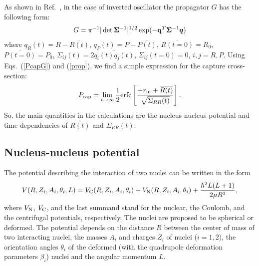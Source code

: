 \documentclass[preprint,review,12pt]{elsarticle}
\begin{document}
  As shown in Ref.~\cite{DMDadonov}, in the case of inverted oscillator the propagator $G$ has the following form:
  \begin{eqnarray}
  G=\pi^{-1}|\det {\bf \Sigma}^{-1}|^{1/2} \exp(-{\bf q}^{T}{\bf \Sigma}^{-1}{\bm q})
  \label{prop}
  \end{eqnarray}
  where
  $q_R(t)=R-\overline{R(t)}$, $q_P(t)=P-\overline{P(t)}$, $\overline{R(t=0)}=R_0$,
  $\overline{P(t=0)}=P_0$, $\Sigma_{ij}(t)=2\overline{q_i(t)q_j(t)}$, $\Sigma_{ij}(t=0)=0$,
  $i,j=R,P$.
  Using Eqs.~(\ref{PcapG}) and (\ref{prop}), we find a simple expression for the capture cross-section:
  \begin{eqnarray}
  P_{\rm cap}=\lim_{t\to\infty}\frac{1}{2} {\rm erfc}\left[\frac{-r_{\rm in}+\overline{R(t)}} {{\sqrt{\Sigma_{RR}(t)}}}\right].
  \label{propPcap}
  \end{eqnarray}
  So, the main quantities in the calculations are the nucleus-nucleus potential and
  time dependencies of $\overline{R(t)}$ and $\Sigma_{RR}(t)$.

\subsection{Nucleus-nucleus potential}

  The potential describing the interaction of two nuclei can
  be written in the form \cite{poten}
  \begin{eqnarray}
  V(R,Z_i, A_i,\theta_i,L)=V_{\rm C}(R,Z_i, A_i,\theta_i)+V_{\rm N}(R,Z_i, A_i,\theta_i)+\frac{\hbar^2 L(L+1)}{2\mu R^2},
  \label{pot}
  \end{eqnarray}
  where $V_{\rm N}$, $V_{\rm C}$, and the last summand stand for the nuclear,
  the Coulomb, and the centrifugal potentials, respectively.
  The nuclei are proposed to be spherical or deformed. The
  potential depends on the distance $R$ between the center of
  mass of two interacting nuclei, the masses $A_i$ and charges $Z_i$ of
  nuclei ($i = 1, 2$), the orientation angles $\theta_i$ of the deformed
  (with the quadrupole deformation parameters $\beta_i$) nuclei
  and the angular momentum $L$.
\end{document}
